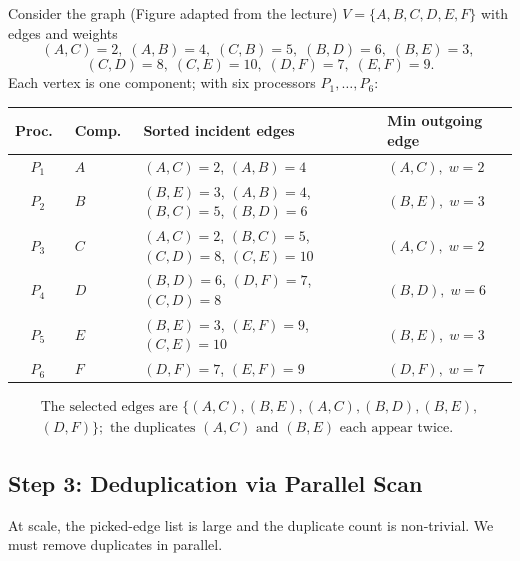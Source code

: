 \begin{ppexample}
Consider the graph (Figure adapted from the lecture)
$V = \{A, B, C, D, E, F\}$ with edges and weights
\[
  (A,C){=}2,\; (A,B){=}4,\; (C,B){=}5,\; (B,D){=}6,\; (B,E){=}3,\
\]
\[
   (C,D){=}8,\; (C,E){=}10,\;(D,F){=}7,\; (E,F){=}9.
\]
Each vertex is one component; with six processors $P_1, \ldots, P_6$:

\begin{center}
\small
\begin{tabular}{@{}clp{4.8cm}l@{}}
\toprule
Proc.\ & Comp.\ & Sorted incident edges & Min outgoing edge \\
\midrule
$P_1$ & $A$ & $(A,C){=}2$, $(A,B){=}4$ & $(A,C),\; w{=}2$ \\
$P_2$ & $B$ & $(B,E){=}3$, $(A,B){=}4$, $(B,C){=}5$, $(B,D){=}6$ & $(B,E),\; w{=}3$ \\
$P_3$ & $C$ & $(A,C){=}2$, $(B,C){=}5$, $(C,D){=}8$, $(C,E){=}10$ & $(A,C),\; w{=}2$ \\
$P_4$ & $D$ & $(B,D){=}6$, $(D,F){=}7$, $(C,D){=}8$ & $(B,D),\; w{=}6$ \\
$P_5$ & $E$ & $(B,E){=}3$, $(E,F){=}9$, $(C,E){=}10$ & $(B,E),\; w{=}3$ \\
$P_6$ & $F$ & $(D,F){=}7$, $(E,F){=}9$ & $(D,F),\; w{=}7$ \\
\bottomrule
\end{tabular}
\end{center}

\[
\begin{aligned}
\text{The selected edges are } \{(A,C), (B,E), (A,C), (B,D), (B,E), \\
(D,F)\}; \text{ the duplicates } (A,C) \text{ and } (B,E) \text{ each appear twice.}
\end{aligned}
\]
\end{ppexample}

\subsection{Step 3: Deduplication via Parallel Scan}

At scale, the picked-edge list is large and the duplicate count is
non-trivial.  We must remove duplicates in parallel.

